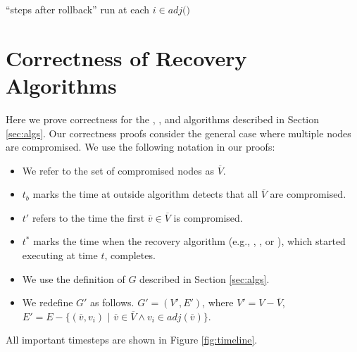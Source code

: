 \begin{algorithm}
\caption{\cpr ``steps after rollback'' run at each $i \in adj($\bads$)$}
\label{alg:cpr}

\begin{algorithmic}[1]

	\IF{\minvis$[d] = \infty$}
	\ENDIF
\ENDFOR
{}
\ENDIF



\end{algorithmic}
\end{algorithm}


\section{Correctness of Recovery Algorithms}
\label{sec:correct}

Here we prove correctness for the \seconds, \purges, and \cpr algorithms described in Section \ref{sec:algs}.
Our correctness proofs consider the general case where multiple nodes are compromised. We use the following notation in our proofs:
\begin{itemize}
	\item We refer to the set of compromised nodes as $\overline{V}$. 
	\item $t_b$ marks the time at outside algorithm detects that all $\overline{V}$ are compromised. 
	\item $t'$ refers to the time the first $\overline{v} \in \overline{V}$ is compromised. 
	\item $t^*$ marks the time when the recovery algorithm (e.g., \seconds, \purges, or \cprs), which started executing at time $t$, completes.
	\item We use the definition of $G$ described in Section \ref{sec:algs}.
	\item We redefine $G'$ as follows. $G'=(V',E')$, where $V' = V - \overline{V}$, $E'=E - \{(\overline{v},v_i)$ $|$ $\overline{v} \in \overline{V} \wedge v_i \in adj(\overline{v}) \}$.
\end{itemize}
All important timesteps are shown in Figure \ref{fig:timeline}.


